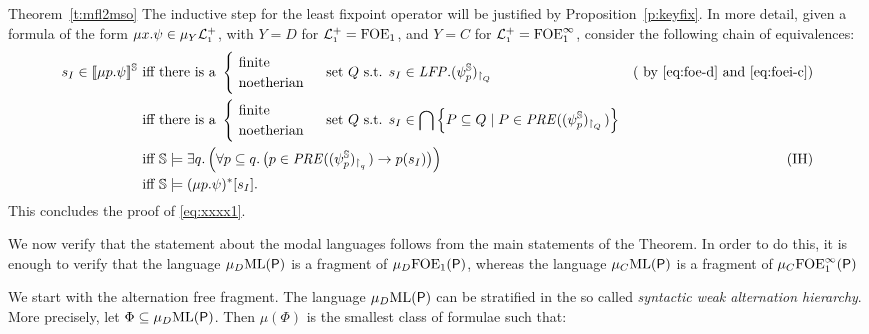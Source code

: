\begin{proofof}{Theorem~\ref{t:mfl2mso}}
The inductive step for the least fixpoint operator will be justified by 
Proposition~\ref{p:keyfix}.
In more detail, given a formula of the form $\mu x. \psi \in\mu_{Y} \mathcal{L}_{\scriptscriptstyle 1}^{+}$, with $Y=D$ for $\mathcal{L}_{\scriptscriptstyle 1}^{+} =\mathrm{FOE}_1$, and $Y=C$ for $\mathcal{L}_{\scriptscriptstyle 1}^{+} =\mathrm{FOE}^{\infty}_1$, 
consider the following chain of equivalences:
\begin{align*}
s_{I} \in \mng{\mu p.\psi}^{\bbS} \text{ iff } &
   \text{there is a }\begin{cases} \text{ finite} & \\ \text{ noetherian} & \end{cases} \text{ set $Q$ s.t. } 
   s_{I} \in \LFP. (\psi^{\model}_{p})_{\rst{Q}} 
   & \text{( by \eqref{eq:foe-d} and \eqref{eq:foei-c})}
\\ \text{ iff } &
\text{there is a }\begin{cases} \text{ finite} & \\ \text{ noetherian} & \end{cases} \text{ set $Q$ s.t. } 
   s_{I} \in \bigcap \Big\{ P \subseteq Q \mid P \in 
   \PRE((\psi^{\model}_{p})_{\rst{Q}})\Big\} 
\\ \text{ iff } & 
    \bbS \models \exists q.\, \Big(\forall p \subseteq q.\,
       \big(p \in \PRE((\psi^{\model}_{p})_{\rst{q}}) \to p(s_{I})\big)
       \Big)
   & (\text{IH})
\\ \text{ iff } & 
    \bbS \models (\mu p. \psi)^{*}[s_{I}].
\end{align*}
This concludes the proof of \eqref{eq:xxxx1}.

We now verify that the statement about the modal languages follows from the main statements of the Theorem.
In order to do this, it is enough to verify that the language $\mu_{D}
\mathrm{ML}(\mathsf{P})$ is a fragment of $\mu_{D}\mathrm{FOE}_1(\mathsf{P})$, whereas  the language $\mu_{C}\mathrm{ML}(\mathsf{P})$ is a fragment of $\mu_{C}\mathrm{FOE}^{\infty}_1(\mathsf{P})$

We start with the alternation free fragment.
The language $\mu_{D}\mathrm{ML}(\mathsf{P})$ can be stratified in the so called \emph{syntactic weak alternation hierarchy}.  More precisely, let $\Phi \subseteq \mu_{D}\mathrm{ML}(\mathsf{P})$.
Then $\mu(\Phi)$ is the smallest class of formulae such that:


\end{proofof}
